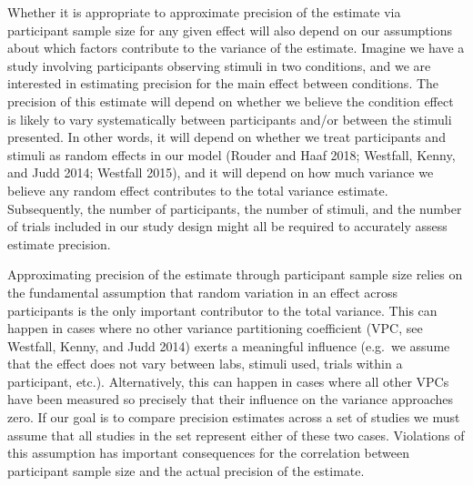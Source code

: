 \documentclass[]{article}
\begin{document}
Whether it is appropriate to approximate precision of the estimate via
participant sample size for any given effect will also depend on our
assumptions about which factors contribute to the variance of the
estimate. Imagine we have a study involving participants observing
stimuli in two conditions, and we are interested in estimating precision
for the main effect between conditions. The precision of this estimate
will depend on whether we believe the condition effect is likely to vary
systematically between participants and/or between the stimuli
presented. In other words, it will depend on whether we treat
participants and stimuli as random effects in our model (Rouder and Haaf
2018; Westfall, Kenny, and Judd 2014; Westfall 2015), and it will depend
on how much variance we believe any random effect contributes to the
total variance estimate. Subsequently, the number of participants, the
number of stimuli, and the number of trials included in our study design
might all be required to accurately assess estimate precision.

Approximating precision of the estimate through participant sample size
relies on the fundamental assumption that random variation in an effect
across participants is the only important contributor to the total
variance. This can happen in cases where no other variance partitioning
coefficient (VPC, see Westfall, Kenny, and Judd 2014) exerts a
meaningful influence (e.g.~we assume that the effect does not vary
between labs, stimuli used, trials within a participant, etc.).
Alternatively, this can happen in cases where all other VPCs have been
measured so precisely that their influence on the variance approaches
zero. If our goal is to compare precision estimates across a set of
studies we must assume that all studies in the set represent either of
these two cases. Violations of this assumption has important
consequences for the correlation between participant sample size and the
actual precision of the estimate.
\end{document}
